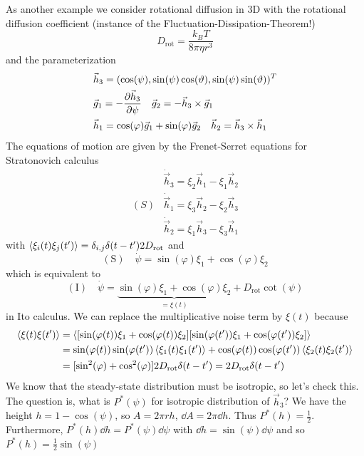 \documentclass{notebook}
\begin{document}
As another example we consider rotational diffusion in 3D with the rotational diffusion coefficient (instance of the Fluctuation-Dissipation-Theorem!)
%
\begin{equation}
	D_{\mathrm{rot}} = \frac{k_B T}{8 \pi \eta r^3}
\end{equation}
%
and the parameterization
%
\begin{align*}
	& \vec{h}_3 = (\cos(\psi), \sin(\psi) \cos(\vartheta), \sin(\psi) \sin(\vartheta))^T \\
	& \vec{g}_1 = - \pdv{\vec{h}_3}{\psi} \quad \vec{g}_2 = - \vec{h}_3 \times \vec{g}_1 \\
	& \vec{h}_1 = \cos(\varphi) \vec{g}_1 + \sin(\varphi) \vec{g}_2 \quad \vec{h}_2 = \vec{h}_3 \times \vec{h}_1
\end{align*}
%
The equations of motion are given by the Frenet-Serret equations for Stratonovich calculus
%
\begin{eqnarray*}
& \dot{\vec{h}}_3 = \xi_2 \vec{h}_1 - \xi_1 \vec{h}_2 \\
(S) & \dot{\vec{h}}_1 = \xi_3 \vec{h}_2 - \xi_2 \vec{h}_3 \\
& \dot{\vec{h}}_2 =   \xi_1 \vec{h}_3 -\xi_3 \vec{h}_1
\end{eqnarray*}
%
with $\expval{\xi_i(t) \xi_j(t')} = \delta_{i,j} \delta(t-t') 2 D_{\mathrm{rot}}$ and
%
\begin{equation}
\mathrm{(S)} \quad \dot{\psi} = \sin(\varphi) \xi_1 + \cos(\varphi) \xi_2
\end{equation}
%
which is equivalent to
%
\begin{equation}
\mathrm{(I)} \quad \dot{\psi} = \underbrace{\sin(\varphi) \xi_1 + \cos(\varphi) \xi_2}_{= \xi(t)} + D_{\mathrm{rot}} \cot(\psi)
\end{equation}
%
in Ito calculus. We can replace the multiplicative noise term by $\xi(t)$ because
%
\begin{align*}
\expval{\xi(t) \xi(t')} &= \expval{[\sin(\varphi(t)) \xi_1 + \cos(\varphi(t)) \xi_2] [\sin(\varphi(t')) \xi_1 + \cos(\varphi(t')) \xi_2]} \\
&= \sin(\varphi(t))\sin(\varphi(t')) \expval{\xi_1(t) \xi_1(t')} + \cos(\varphi(t))\cos(\varphi(t')) \expval{\xi_2(t) \xi_2(t')} \\
&= [\sin^2(\varphi) + \cos^2(\varphi)] 2 D_{\mathrm{rot}} \delta(t-t') = 2 D_{\mathrm{rot}} \delta(t-t')
\end{align*}
%
We know that the steady-state distribution must be isotropic, so let's check this. The question is, what is $P^*(\psi)$ for isotropic distribution of $\vec{h}_3$? We have the height $h = 1- \cos(\psi)$, so $A = 2 \pi r h$, $\dd{A} = 2 \pi \dd{h}$. Thus $P^*(h) = \frac{1}{2}$. Furthermore, $P^*(h) \dd{h} = P^*(\psi) \dd{\psi}$ with $\dd{h} = \sin(\psi) \dd{\psi}$ and so $P^*(h) = \frac{1}{2} \sin(\psi)$
\end{document}
